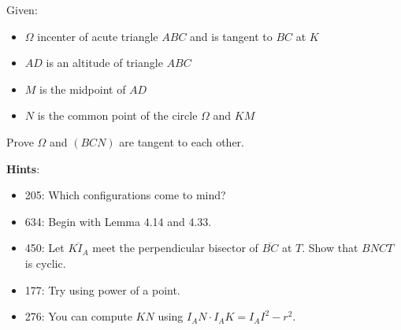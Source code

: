 \documentclass[11pt,twoside]{scrartcl}
\begin{document}
Given: 
\begin{itemize}
    \item $\Omega$ incenter of acute triangle $ABC$ and is tangent to $BC$ at $K$
    \item $AD$ is an altitude of triangle $ABC$
    \item $M$ is the midpoint of $AD$
    \item $N$ is the common point of the circle $\Omega$ and $KM$
\end{itemize}
Prove $\Omega$ and $(BCN)$ are tangent to each other.

\textbf{Hints}:
\begin{itemize}
    \item 205: Which configurations come to mind?
    \item 634: Begin with Lemma 4.14 and 4.33.
    \item 450: Let ${\overline{KI_A}}$ meet the perpendicular bisector of $\overline{BC}$ at $T$. Show that $BNCT$ is cyclic.
    \item 177: Try using power of a point.
    \item 276: You can compute $KN$ using $I_AN \cdot I_AK = I_AI^2 - r^2$.
\end{itemize}
\end{document}
